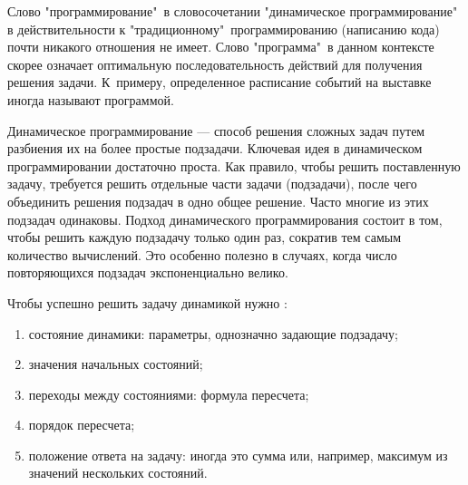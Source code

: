 \documentclass[12pt, a4paper]{article}
\begin{document}
	Слово "программирование"\, в словосочетании "динамическое программирование"\, в действительности к "традиционному"\, программированию (написанию кода) почти никакого отношения не имеет. Слово "программа"\, в данном контексте скорее означает оптимальную последовательность действий для получения решения задачи. К~примеру, определенное расписание событий на выставке иногда называют программой.
	
	Динамическое программирование --- способ решения сложных задач путем разбиения их на более простые подзадачи. Ключевая идея в динамическом программировании достаточно проста. Как правило, чтобы решить поставленную задачу, требуется решить отдельные части задачи (подзадачи), после чего объединить решения подзадач в одно общее решение. Часто многие из этих подзадач одинаковы. Подход динамического программирования состоит в том, чтобы решить каждую подзадачу только один раз, сократив тем самым количество вычислений. Это особенно полезно в случаях, когда число повторяющихся подзадач экспоненциально велико.
	
	Чтобы успешно решить задачу динамикой нужно \cite{habr}:
	\begin{enumerate}
		\item состояние динамики: параметры, однозначно задающие подзадачу;
		\item значения начальных состояний;
		\item переходы между состояниями: формула пересчета;
		\item порядок пересчета;
		\item положение ответа на задачу: иногда это сумма или, например, максимум из значений нескольких состояний.
	\end{enumerate}
	
\end{document}
